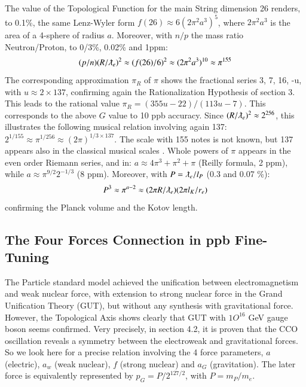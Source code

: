 \documentclass[twoside,draft]{article}
\begin{document}
\begin{sloppypar}
The value of the Topological Function for the main String
 dimension 26 renders, to 0.1\%, the same Lenz-Wyler form $f(26) \approx 6(2\pi^{2} a^{3} )^{5}$, where $2\pi^{2}a^{3}$ is the area of a 4-sphere of radius $a$. Moreover, with $n/p$ the mass ratio Neutron/Proton, to 0/3\%, 0.02\% and 1ppm:
\begin{equation} 
(p/n) (R/\lambdabar_{e})^{2} \approx (f(26)/6)^{2} \approx (2\pi^{2} a^{3})^{10} \approx \pi^{155}
\end{equation}
The corresponding approximation $\pi_R$ of $\pi$ shows the fractional series 3, 7, 16, -u, with $u \approx
2 \times 137$, confirming again the Rationalization Hypothesis of section 3. This leads to the rational value
$\pi_{R} = (355u-22)/(113u-7)$. This corresponds to the above $G$ value to 10 ppb accuracy.
Since $(R/\lambdabar_{e})^{2} \approx 2^{256} $, this illustrates the following musical relation involving again 137: $2^{1/155} \approx \pi^{1/256} \approx (2\pi)^{1/3 \times 137}$. The scale with 155 notes is not known, but 137 appears also in the classical musical scales \cite{Sanchez1}. Whole powers of $\pi$ appears in the even order Riemann series, and in:
$a \approx 4\pi^{3} + \pi^{2} + \pi $ (Reilly formula, 2 ppm), while $a \approx \pi^{9/2}2^{-1/3}$ (8 ppm). Moreover, with $P = \lambdabar_e/ l_P$ (0.3 and 0.07 \%):
\begin{equation}
P^3 \approx \pi^{a-2} \approx (2\pi R/\lambdabar_e)(2 \pi l_K/r_e) 
\end{equation}
confirming the Planck volume and the Kotov length.


\subsection {The Four Forces Connection in ppb Fine-Tuning}

The Particle standard model achieved the unification between electromagnetism and weak nuclear force, with extension to strong nuclear force in the Grand Unification Theory (GUT), but without any synthesis with gravitational force. However, the Topological Axis shows clearly that GUT with $1O^{16}$ GeV gauge boson seems confirmed. Very precisely, in section 4.2, it is proven that the CCO oscillation reveals a symmetry between the electroweak and gravitational forces. So we look here for a precise relation involving the 4 force parameters, $a$ (electric), $a_w$ (weak nuclear), $f$ (strong nuclear) and $a_G$ (gravitation). The later force is equivalently represented by $p_G = P/2^{127/2}$, with $P = m_P/m_e$. 


\end{sloppypar}
\end{document}
